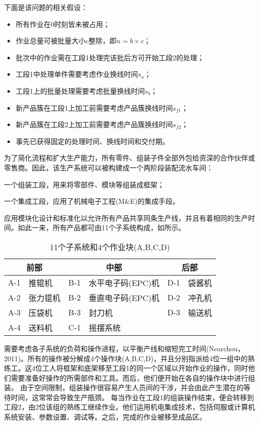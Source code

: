 下面是该问题的相关假设：
\begin{itemize}
\itemsep=0pt\parskip=0pt
\item 所有作业在0时刻皆未被占用；
\item 作业总量可被批量大小$c$整除，即$n=b\times c$；
\item 批次中的作业需在工段1处理完该批后方可开始工段2的处理；
\item 工段1中处理单件需要考虑作业换线时间$s_a$；
\item 工段1上的批量处理需要考虑批量换线时间$s_b$；
\item 新产品簇在工段1上加工前需要考虑产品簇换线时间$s_{f1}$；
\item 新产品簇在工段2上加工前需要考虑产品簇换线时间$s_{f2}$；
\item 事先已获得固定的处理时间、换线时间和交付期。
\end{itemize}
为了简化流程和扩大生产能力，所有零件、组装子件全部外包给资深的合作伙伴或零售商。因此，该生产系统可以被构建成一个两阶段装配流水车间：
\begin{inparaenum}[(1)]
\item 一个组装工段，用来将零部件、模块等组装成框架；
\item 一个集成工段，应用了机械电子工程(M\&E)的集成手段。
\end{inparaenum}
应用模块化设计和标准化以允许所有产品共享同条生产线，并且有着相同的生产时间。如此一来，所有产品都可由11个子系统构成，如所示。
\begin{table}[h]
  \centering\xiaowu
  \caption{11个子系统和4个作业块(A,B,C,D)}
    \begin{tabular}{llllll}
    \toprule
    \multicolumn{2}{c}{前部} & \multicolumn{2}{c}{中部} & \multicolumn{2}{c}{后部} \\
    \midrule
    A-1   & 推辊机   & B-1   & 水平电子码(EPC)机 & D-1   & 袋酱机 \\
    A-2   & 张力锟机  & B-2   & 垂直电子码(EPC)机 & D-2   & 冲孔机 \\
    A-3   & 压袋机   & B-3   & 封刀机   & D-3   & 输送机 \\
    A-4   & 送料机   & C-1   & 摇摆系统  &       &  \\
    \bottomrule
    \end{tabular}%
  \label{tab:11+4}%
\end{table}%
需要考虑各子系统的负荷和操作进程，以平衡产线和缩短完工时间(Nearchou，2011)。所有的操作被分解成4个操作块(A,B,C,D)，并且分别指派给4位一组中的熟练工。这4位工人将框架和底架移至工段1的同一个区域以开始作业的操作，同时他们需要准备好操作的所需部件和工具。而后，他们便开始在各自的操作块中进行组装。
由于空间限制，组装操作很容易产生人员间的干涉，并会由此产生潜在的等待时间，这常常会导致生产瓶颈。
每当作业在工段1的组装操作结束，便会转移到工段2，由2位该组的熟练工继续作业。他们运用机电集成技术，包括伺服或计算机系统安装、参数设置、调试等。之后，完成的作业被移至成品区。


